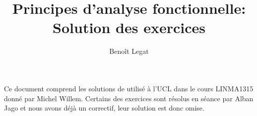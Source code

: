 

\newcommand{\R}{\mathbb{R}}
\renewcommand{\L}{\mathcal{L}}

\newcommand{\cfrape}[2]{Voir l'exercice~#2 de l'ape~#1}

\newcommand{\nosolution}
{Cet exercice ne contient pas encore de solution.
Vous êtes invité à nous en soumettre une à l'adresse suivante
\begin{center}
\url{https://github.com/blegat/LINMA1315-Sol}
\end{center}
ou par mail.}

\title{Principes d'analyse fonctionnelle: Solution des exercices}
\author{Benoît Legat}


\maketitle

Ce document comprend les solutions de \cite{willem2008principes}
utilisé à l'UCL dans le cours LINMA1315 donné par Michel Willem.
Certains des exercices sont résolus en séance par Alban Jago
et nous avons déjà un correctif, leur solution est donc omise.

